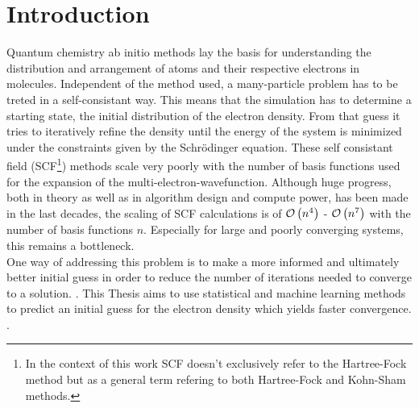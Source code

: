 \chapter{Introduction}
\label{sec:introduction}

Quantum chemistry ab initio methods lay the basis for understanding the distribution and arrangement of atoms and their respective electrons in molecules. Independent of the method used, a many-particle problem has to be treted in a self-consistant way. This means that the simulation has to determine a starting state,  the initial distribution of the electron density. From that guess it tries to iteratively refine the density until the energy of the system is minimized under the constraints given by the Schrödinger equation. These self consistant field (SCF\footnote{In the context of this work SCF doesn't exclusively refer to the Hartree-Fock method but as a general term refering to both Hartree-Fock and Kohn-Sham methods.}) methods scale very poorly with the number of basis functions used for the expansion of the multi-electron-wavefunction. Although huge progress, both in theory as well as in algorithm design and compute power, has been made in the last decades, the scaling of SCF calculations is of $\mathcal{O}\left(n^4\right)$ - $\mathcal{O}\left(n^7\right)$ with the number of basis functions $n$. Especially for large and poorly converging systems, this remains a bottleneck. \\
One way of addressing this problem is to make a more informed and ultimately better initial guess in order to reduce the number of iterations needed to converge to a solution. . This Thesis aims to use statistical and machine learning methods to predict an initial guess for the electron density which yields faster convergence. . 


